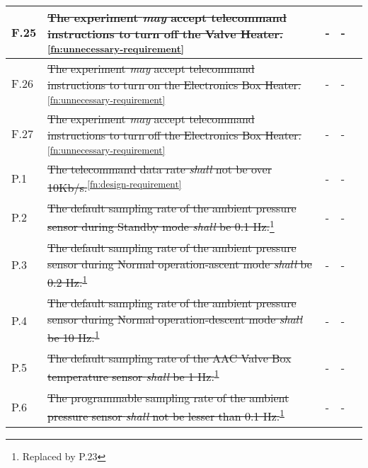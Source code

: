 \begin{longtable}[]{|m{}| m{} |m{} |m{}|m{}|}
F.25 & \st{The experiment \textit{may} accept telecommand instructions to turn off the Valve Heater.}\textsuperscript{\ref{fn:unnecessary-requirement}}                                                                                         &      -        & -            &        \\ \hline
F.26 & \st{The experiment \textit{may} accept telecommand instructions to turn on the Electronics Box Heater.}\textsuperscript{\ref{fn:unnecessary-requirement}}                                                                                     &      -        & -            &        \\ \hline
F.27 & \st{The experiment \textit{may} accept telecommand instructions to turn off the Electronics Box Heater.}\textsuperscript{\ref{fn:unnecessary-requirement}}                                                                                    &      -        & -            &        \\ \hline
P.1  & \st{The telecommand data rate \textit{shall} not be over 10Kb/s.}\textsuperscript{\ref{fn:design-requirement}}                                                                                                                           &        -      & -          &        \\ \hline
P.2  & \st{The default sampling rate of the ambient pressure sensor during Standby mode \textit{shall} be 0.1 Hz.}\footnote{Replaced by P.23\label{replaceSoftVeri}}                                                                       &      -  & -  &        \\ \hline
P.3  & \st{The default sampling rate of the ambient pressure sensor during Normal operation-ascent mode \textit{shall} be 0.2 Hz.}\textsuperscript{\ref{replaceSoftVeri}}                                                           &    -        & -        &        \\ \hline
P.4  & \st{The default sampling rate of the ambient pressure sensor during Normal operation-descent mode \textit{shall} be 10 Hz.}\textsuperscript{\ref{replaceSoftVeri}}                                                           &   -     & -    &        \\ \hline
P.5  & \st{The default sampling rate of the AAC Valve Box temperature sensor \textit{shall} be 1 Hz.}\textsuperscript{\ref{replaceSoftVeri}}                                                                                        &     -        &  -            &        \\ \hline
P.6  &\st{ The programmable sampling rate of the ambient pressure sensor \textit{shall} not be lesser than 0.1 Hz.}\textsuperscript{\ref{replaceSoftVeri}}                                                                          &      -    & -            &        \\ \hline

\end{longtable}
